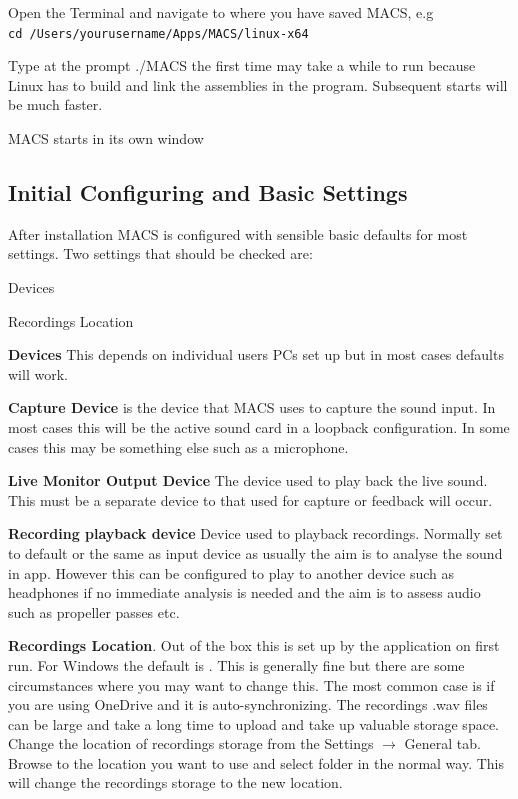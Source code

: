 \begin{compactenum}
    \item Open the Terminal and navigate to where you have saved MACS, e.g \\
    \texttt{cd /Users/yourusername/Apps/MACS/linux-x64}
    \item Type at the prompt ./MACS the first time may take a while to run because Linux has to build and link the assemblies in the program. Subsequent starts will be much faster.
    \item MACS starts in its own window
\end{compactenum}

\subsection{Initial Configuring and Basic Settings}

After installation MACS is configured with sensible basic defaults for most settings. Two settings that should be checked are:

\begin{compactitem}
    \item Devices
    \item Recordings Location
\end{compactitem}

\textbf{Devices}
This depends on individual users PCs set up but in most cases defaults will work.

\begin{compactitem}
    \item \textbf{Capture Device} is the device that MACS uses to capture the sound input. In most cases this will be the active sound card in a loopback configuration. In some cases this may be something else such as a microphone.
    \item \textbf{Live Monitor Output Device} The device used to play back the live sound. This must be a separate device to that used for capture or feedback will occur.
    \item \textbf{Recording playback device} Device used to playback recordings. Normally set to default or the same as input device as usually the aim is to analyse the sound in app. However this can be configured to play to another device such as headphones if no immediate analysis is needed and the aim is to assess audio such as propeller passes etc.
\end{compactitem}

\textbf{Recordings Location}. Out of the box this is set up by the application on first run. For Windows the default is . This is generally fine but there are some circumstances where you may want to change this. The most common case is if you are using OneDrive and it is auto-synchronizing. The recordings .wav files can be large and take a long time to upload and take up valuable storage space. Change the location of recordings storage from the Settings $\rightarrow$ General tab. Browse to the location you want to use and select folder in the normal way. This will change the recordings storage to the new location.


